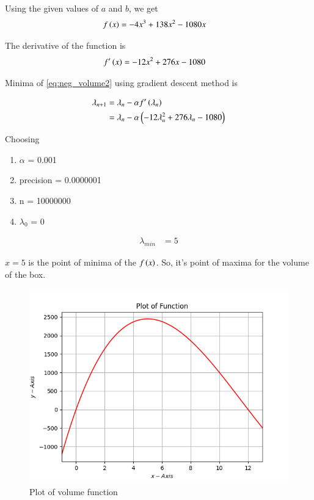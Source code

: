 \documentclass[journal,12pt,twocolumn]{IEEEtran}
\begin{document}
Using the given values of $a$ and $b$, we get
\begin{align}
    \label{eq:neg_volume2}
    f\left(x\right) &= -4x^3 + 138x^2 - 1080x
\end{align}

The derivative of the function is
\begin{align}
    f^\prime\left(x\right) &= -12x^2 + 276x - 1080 
\end{align}

Minima of \eqref{eq:neg_volume2} using gradient descent method is

\begin{align}
	\lambda_{n+1} &= \lambda_n - \alpha f^\prime\left(\lambda_n\right)\\
    \label{eq:grad_dec/eq1}
    &= \lambda_n - \alpha \left(-12\lambda_n^2 + 276\lambda_n - 1080\right)\\
\end{align}

Choosing
\begin{enumerate}
 \item $\alpha$ = 0.001
 \item precision = 0.0000001
 \item n = 10000000 
 \item $\lambda_0$ = 0
\end{enumerate}

\begin{align}
    \lambda_{min} &= 5
\end{align}

$x=5$ is the point of minima of the $f\left(x\right)$.
So, it's point of maxima for the volume of the box.

\begin{figure}[!htb]
    \centering
    \includegraphics[width=\columnwidth]{figs/plot.png}
    \caption{Plot of volume function}
    \label{fig:plot of function}
\end{figure}
\end{document}
